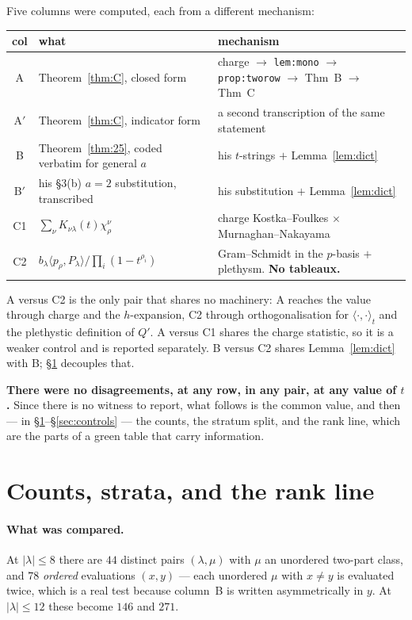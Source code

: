 \documentclass[11pt]{article}
\theoremstyle{definition}
\newcommand{\lam}{\lambda}
\newcommand{\Qp}{Q'}
\begin{document}
Five columns were computed, each from a different mechanism:
\begin{center}
\begin{tabular}{cll}
\toprule
col & what & mechanism \\ \midrule
A   & Theorem~\ref{thm:C}, closed form &
      charge $\to$ \texttt{lem:mono} $\to$ \texttt{prop:tworow} $\to$ Thm~B $\to$ Thm~C \\
A$'$ & Theorem~\ref{thm:C}, indicator form & a second transcription of the same statement \\
B   & Theorem~\ref{thm:25}, coded verbatim for general $a$ &
      his $t$-strings $+$ Lemma~\ref{lem:dict} \\
B$'$ & his \S3(b) $a=2$ substitution, transcribed &
      his substitution $+$ Lemma~\ref{lem:dict} \\
C1  & $\sum_\nu K_{\nu\lam}(t)\chi^\nu_\rho$ &
      charge Kostka--Foulkes $\times$ Murnaghan--Nakayama \\
C2  & $b_\lam\langle p_\rho,P_\lam\rangle/\prod_i(1-t^{\rho_i})$ &
      Gram--Schmidt in the $p$-basis $+$ plethysm. \textbf{No tableaux.} \\
\bottomrule
\end{tabular}
\end{center}
A versus C2 is the only pair that shares no machinery: A reaches the value through charge and the
$h$-expansion, C2 through orthogonalisation for $\langle\cdot,\cdot\rangle_t$ and the plethystic
definition of $\Qp$. A versus C1 shares the charge statistic, so it is a weaker control and is
reported separately. B versus C2 shares Lemma~\ref{lem:dict} with B; \S\ref{sec:checks} decouples
that.

\textbf{There were no disagreements, at any row, in any pair, at any value of $t$.} Since there is
no witness to report, what follows is the common value, and then --- in
\S\ref{sec:checks}--\S\ref{sec:controls} --- the counts, the stratum split, and the rank line,
which are the parts of a green table that carry information.



\section{Counts, strata, and the rank line}\label{sec:checks}

\paragraph{What was compared.}
At $|\lam|\le8$ there are $44$ distinct pairs $(\lam,\mu)$ with $\mu$ an unordered two-part class,
and $78$ \emph{ordered} evaluations $(x,y)$ --- each unordered $\mu$ with $x\ne y$ is evaluated
twice, which is a real test because column~B is written asymmetrically in $y$. At $|\lam|\le12$
these become $146$ and $271$.
\end{document}
